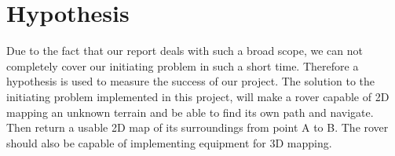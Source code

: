 \section{Hypothesis}

Due to the fact that our report deals with such a broad scope, we can not completely cover our initiating problem in such a short time. Therefore a hypothesis is used to measure the success of our project.
The solution to the initiating problem implemented in this project, will make a rover capable of 2D mapping an unknown terrain and be able to find its own path and navigate. Then return a usable 2D map of its surroundings from point A to B. The rover should also be capable of implementing equipment for 3D mapping.
